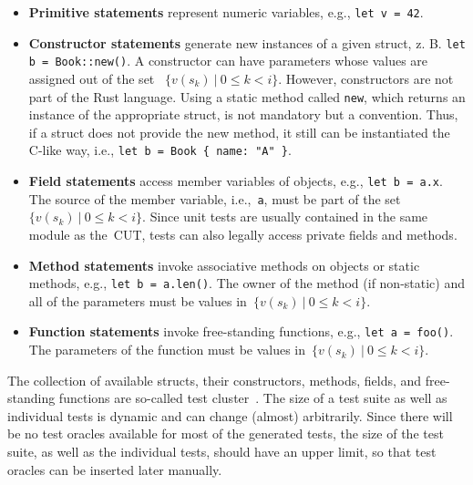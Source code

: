 \documentclass{article}
\begin{document}
\begin{itemize} 
    \item \textbf{Primitive statements} represent numeric variables, e.g., \lstinline{let v = 42}.
    \item \textbf{Constructor statements} generate new instances of a given struct, z. B. \lstinline{let b = Book::new()}. A constructor can have parameters whose values are assigned out of the set ~$\{v(s_k)~|~0 \leq k < i\}$. However, constructors are not part of the Rust language. Using a static method called \lstinline{new}, which returns an instance of the appropriate struct, is not mandatory but a convention. Thus, if a struct does not provide the new method, it still can be instantiated the C-like way, i.e., \lstinline|let b = Book { name: "A" }|. 
    \item \textbf{Field statements} access member variables of objects, e.g., \lstinline{let b = a.x}. The source of the member variable, i.e.,~\lstinline{a}, must be part of the set~$\{v(s_k)~|~0 \leq k < i\}$. Since unit tests are usually contained in the same module as the~\ac{CUT}, tests can also legally access private fields and methods. 
    \item \textbf{Method statements} invoke associative methods on objects or static methods, e.g., \lstinline{let b = a.len()}. The owner of the method (if non-static) and all of the parameters must be values in~${\{v(s_k)~|~0 \leq k < i\}}$.
    \item \textbf{Function statements} invoke free-standing functions, e.g., \lstinline{let a = foo()}. The parameters of the function must be values in~$\{v(s_k)~|~0 \leq k < i\}$. 
\end{itemize}


The collection of available structs, their constructors, methods, fields, and free-standing functions are so-called test cluster~\cite{Fraser_2011}. The size of a test suite as well as individual tests is dynamic and can change (almost) arbitrarily. Since there will be no test oracles available for most of the generated tests, the size of the test suite, as well as the individual tests, should have an upper limit, so that test oracles can be inserted later manually. 
\end{document}
